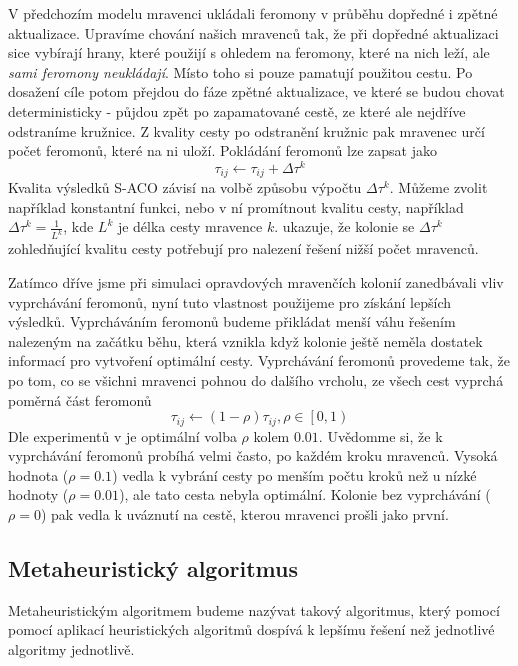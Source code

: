 \documentclass[12pt]{article}
\begin{document}
V předchozím modelu mravenci ukládali feromony v průběhu dopředné i zpětné aktualizace. Upravíme chování našich mravenců tak, že při dopředné aktualizaci sice vybírají hrany, které použijí s ohledem na feromony, které na nich leží, ale \emph{sami feromony neukládají}. Místo toho si pouze pamatují použitou cestu. Po dosažení cíle potom přejdou do fáze zpětné aktualizace, ve které se budou chovat deterministicky - půjdou zpět po zapamatované cestě, ze které ale nejdříve odstraníme kružnice. Z kvality cesty po odstranění kružnic pak mravenec určí počet feromonů, které na ni uloží. Pokládání feromonů lze zapsat jako
\begin{equation}\label{sacoaktualizce}
\tau_{ij} \leftarrow \tau_{ij} + \Delta\tau^k
\end{equation} 
Kvalita výsledků \ac{S-ACO} závisí na volbě způsobu výpočtu $\Delta\tau^{k}$. Můžeme zvolit například konstantní funkci, nebo v ní promítnout kvalitu cesty, například $\Delta\tau^k = \frac{1}{L^{k}}$, kde $L^{k}$ je délka cesty mravence $k$. \cite{maniezzo2004} ukazuje, že kolonie se $\Delta\tau^k$ zohled\v{n}ující kvalitu cesty potřebují pro nalezení řešení nižší počet mravenců.

Zatímco dříve jsme při simulaci opravdových mravenčích kolonií zanedbávali vliv vyprchávání feromonů, nyní tuto vlastnost použijeme pro získání lepších výsledků. Vyprcháváním feromonů budeme přikládat menší váhu řešením nalezeným na začátku běhu, která vznikla když kolonie ještě neměla dostatek informací pro vytvoření optimální cesty. Vyprchávání feromonů provedeme tak, že po tom, co se všichni mravenci pohnou do dalšího vrcholu, ze všech cest vyprchá poměrná část feromonů
\begin{equation}\label{sacovyprchavani}
\tau_{ij} \leftarrow (1 - \rho)\tau_{ij}, \rho \in \left[ 0,1 \right) 
\end{equation} 
Dle experimentů v \cite{maniezzo2004} je optimální volba $\rho$ kolem $0.01$. Uvědomme si, že k vyprchávání feromonů probíhá velmi často, po každém kroku mravenců. Vysoká hodnota ($\rho = 0.1$) vedla k vybrání cesty po menším počtu kroků než u nízké hodnoty ($\rho = 0.01$), ale tato cesta nebyla optimální. Kolonie bez vyprchávání ($\rho = 0$) pak vedla k uváznutí na cestě, kterou mravenci prošli jako první. \cite{maniezzo2004}

\subsection*{Metaheuristický algoritmus}
Metaheuristickým algoritmem budeme nazývat takový algoritmus, který pomocí pomocí aplikací heuristických algoritmů dospívá k lepšímu řešení než jednotlivé algoritmy jednotlivě.
\end{document}
